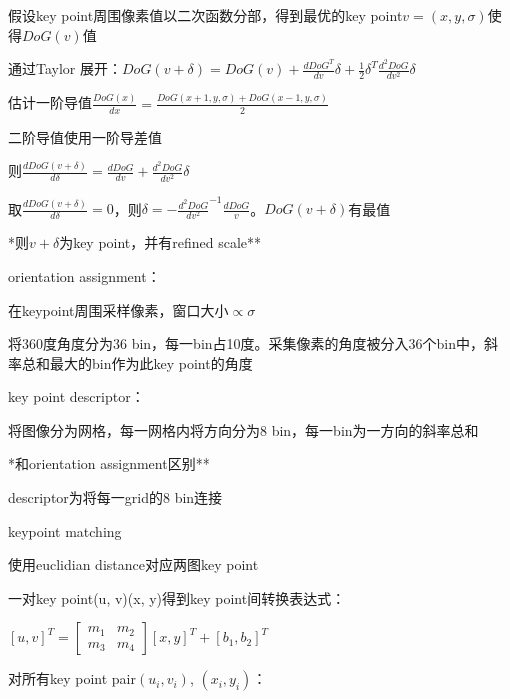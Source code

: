\documentclass[UTF8]{ctexart}
\begin{document}
  \quad \quad 假设key point周围像素值以二次函数分部，得到最优的key point$v = (x, y, \sigma)$使得$DoG(v)$值

  \quad \quad 通过Taylor 展开：$DoG(v + \delta) = DoG(v) + \frac{dDoG^T}{dv}\delta + \frac{1}{2}\delta^T\frac{d^2DoG}{dv^2}\delta$

  \quad \quad \quad 估计一阶导值$\frac{DoG(x)}{dx} = \frac{DoG(x + 1, y, \sigma) + DoG(x - 1, y, \sigma)}{2}$

  \quad \quad \quad 二阶导值使用一阶导差值

  \quad \quad 则$\frac{dDoG(v + \delta)}{d\delta} = \frac{dDoG}{dv} + \frac{d^2DoG}{dv^2}\delta$

  \quad \quad 取$\frac{dDoG(v + \delta)}{d\delta} = 0$，则$\delta = -\frac{d^2DoG}{dv^2}^{-1}\frac{dDoG}{v}$。$DoG(v + \delta)$有最值

  \quad \quad **则$v + \delta$为key point，并有refined scale**

  \quad orientation assignment：

  \quad \quad 在keypoint周围采样像素，窗口大小$\propto \sigma$

  \quad \quad 将360度角度分为36 bin，每一bin占10度。采集像素的角度被分入36个bin中，斜率总和最大的bin作为此key point的角度

  \quad key point descriptor：
  
  \quad \quad 将图像分为网格，每一网格内将方向分为8 bin，每一bin为一方向的斜率总和

  \quad \quad \quad **和orientation assignment区别**

  \quad \quad descriptor为将每一grid的8 bin连接

  \quad keypoint matching

  \quad \quad 使用euclidian distance对应两图key point

  \quad \quad 一对key point(u, v)(x, y)得到key point间转换表达式：

  \quad \quad \quad $[u, v]^T = 
    \begin{bmatrix}
      m_1 & m_2 \\
      m_3 & m_4
      \end{bmatrix}
    [x, y]^T + [b_1, b_2]^T$

  \quad \quad \quad 对所有key point pair$(u_i, v_i)$, $(x_i, y_i)$：
\end{document}
